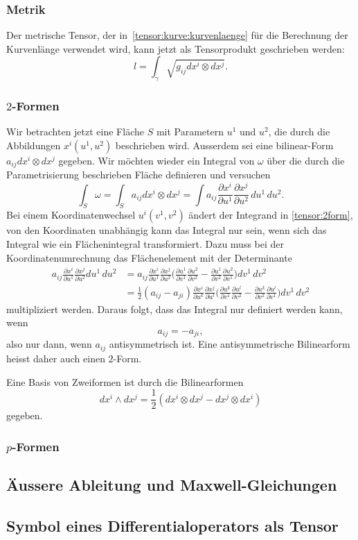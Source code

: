 \subsubsection{Metrik}
Der metrische Tensor, der in~\eqref{tensor:kurve:kurvenlaenge}
für die Berechnung der Kurvenlänge verwendet wird, kann jetzt als
Tensorprodukt geschrieben werden:
\[
l = \int_\gamma \sqrt{g_{ij}dx^i\otimes dx^j}.
\]

\subsubsection{$2$-Formen}
Wir betrachten jetzt eine Fläche $S$ mit Parametern $u^1$ und $u^2$, die
durch die Abbildungen $x^i(u^1,u^2)$ beschrieben wird.
Ausserdem sei eine bilinear-Form $a_{ij}dx^i\otimes dx^j$ gegeben.
Wir möchten wieder ein Integral von $\omega$ über die durch die
Parametrisierung beschrieben Fläche definieren und versuchen
\begin{equation}
\int_S \omega
=
\int_S a_{ij}dx^i\otimes dx^j
=
\int a_{ij}
\frac{\partial x^i}{\partial u^1}
\frac{\partial x^j}{\partial u^2}
\,
du^1\,du^2.
\label{tensor:2form}
\end{equation}
Bei einem Koordinatenwechsel $u^i(v^1, v^2)$ ändert der
Integrand in \eqref{tensor:2form}, von den Koordinaten unabhängig kann
das Integral nur sein, wenn sich das Integral wie ein Flächenintegral 
transformiert.
Dazu muss bei der Koordinatenumrechnung das Flächenelement mit der 
Determinante 
\begin{align*}
a_{ij}
\frac{\partial x^i}{\partial u^1}
\frac{\partial x^j}{\partial u^2}
du^1\,du^2
&=
a_{ij}
\frac{\partial x^i}{\partial u^1}
\frac{\partial x^j}{\partial u^2}
\biggl(
\frac{\partial u^1}{\partial v^1}
\frac{\partial u^2}{\partial v^2}
-
\frac{\partial u^1}{\partial v^2}
\frac{\partial u^2}{\partial v^1}
\biggr)
dv^1\,dv^2
\\
&=
\frac12
(
a_{ij}
-
a_{ji}
)
\frac{\partial x^i}{\partial u^k}
\frac{\partial x^j}{\partial u^l}
\biggl(
\frac{\partial u^k}{\partial v^1}
\frac{\partial u^l}{\partial v^2}
-
\frac{\partial u^k}{\partial v^2}
\frac{\partial u^l}{\partial v^1}
\biggr)
dv^1\,dv^2
\end{align*}
multipliziert werden.
Daraus folgt, dass das Integral nur definiert werden kann, wenn
\[
a_{ij}=-a_{ji},
\]
also nur dann, wenn $a_{ij}$ antisymmetrisch ist.
Eine antisymmetrische Bilinearform heisst daher auch einen $2$-Form.

Eine Basis von Zweiformen ist durch die Bilinearformen
\[
dx^i\wedge dx^j = \frac12 (dx^i\otimes dx^j - dx^j \otimes dx^i)
\]
gegeben.

\subsubsection{$p$-Formen}


\subsection{Äussere Ableitung und Maxwell-Gleichungen}

\subsection{Symbol eines Differentialoperators als Tensor}

